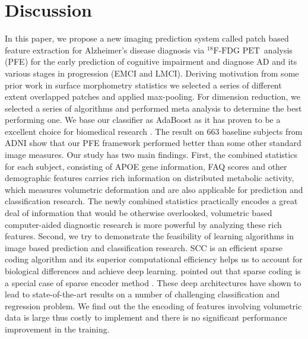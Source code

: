 \documentclass[authoryear,preprint,revi	ew,12pt]{elsarticle}
\newcommand{\Alz} {{Alzheimer\textquoteright s} }
\newcommand{\FDGPET}   {$ ^{18}\textrm{F-FDG PET} $~}
\begin{document}
\section{Discussion}
In this paper, we propose a new imaging prediction system called patch based feature extraction for \Alz disease diagnosis via \FDGPET analysis (PFE) for the early prediction of cognitive impairment and diagnose AD and its various stages in progression (EMCI and LMCI). Deriving motivation from some prior work in surface morphometry statistics  \citep{zhang2016applying,zhang2016hyperbolic}  we selected a series of different extent overlapped patches and applied max-pooling. For dimension reduction, we selected a series of algorithms and performed meta analysis to determine the best performing one. We base our classifier as AdaBoost as it has proven to be a excellent choice for biomedical research  \citep{?.?}. The result on 663 baseline subjects from ADNI show that our PFE framework performed better than some other standard image measures. Our study has two main findings. First, the combined statistics for each subject, consisting of APOE gene information, FAQ scores and other demographic features carries rich information on distributed metabolic activity, which measures volumetric deformation and are also applicable for prediction and classification research. The newly combined statistics practically encodes a great deal of information that would be otherwise overlooked, volumetric based computer-aided diagnostic research is more powerful by analyzing these rich features. Second, we try to demonstrate the feasibility of learning algorithms in image based prediction and classification research. SCC is an efficient sparse coding algorithm and its superior computational efficiency helps us to account for biological differences and achieve deep learning. \citep{gregor2010learning} pointed out that sparse coding is a special case of sparse encoder method \citep{vincent2010stacked,baldi2012autoencoders}. These deep architectures have shown to lead to state-of-the-art results on a number of challenging classification and regression problem. We find out the the encoding of features involving volumetric data is large thus costly to implement and there is no significant performance improvement in the training.  
\end{document}

